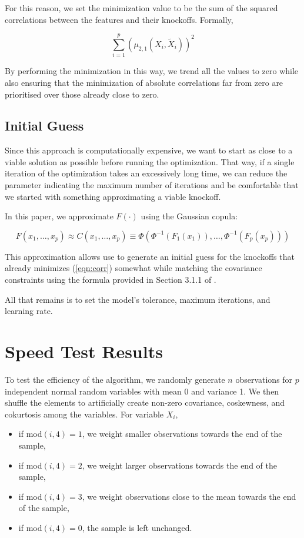 \documentclass[review]{elsarticle}
\begin{document}
For this reason, we set the minimization value to be the sum of the squared correlations between the features and their knockoffs. Formally,

\begin{equation}
\sum_{i=1}^p \left(\mu_{2,1}\left(X_i,\tilde{X}_i\right)\right)^2
\label{eqn:corr}
\end{equation}

By performing the minimization in this way, we trend all the values to zero while also ensuring that the minimization of absolute correlations far from zero are prioritised over those already close to zero.

\subsection{Initial Guess}

Since this approach is computationally expensive, we want to start as close to a viable solution as possible before running the optimization. That way, if a single iteration of the optimization takes an excessively long time, we can reduce the parameter indicating the maximum number of iterations and be comfortable that we started with something approximating a viable knockoff.

In this paper, we approximate $F(\cdot)$ using the Gaussian copula:

$$F(x_1,\dots,x_p)\approx C(x_1,\dots,x_p)\equiv\Phi\left(\Phi^{-1}(F_1(x_1)),\dots,\Phi^{-1}(F_p(x_p))\right)$$

This approximation allows use to generate an initial guess for the knockoffs that already minimizes (\ref{eqn:corr}) somewhat while matching the covariance constraints using the formula provided in Section 3.1.1 of \citet{candes2018panning}.

All that remains is to set the model's tolerance, maximum iterations, and learning rate.

\section{Speed Test Results}

To test the efficiency of the algorithm, we randomly generate $n$ observations for $p$ independent normal random variables with mean 0 and variance 1. We then shuffle the elements to artificially create non-zero covariance, coskewness, and cokurtosis among the variables. For variable $X_i$,

\begin{itemize}
	\item if mod$(i,4)=1$, we weight smaller observations towards the end of the sample,
	\item if mod$(i,4)=2$, we weight larger observations towards the end of the sample,
	\item if mod$(i,4)=3$, we weight observations close to the mean towards the end of the sample,
	\item if mod$(i,4)=0$, the sample is left unchanged.
\end{itemize}
\end{document}
